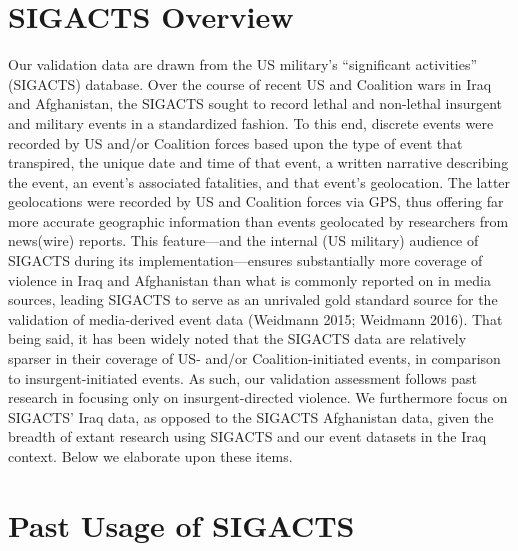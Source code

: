 \documentclass[12pt]{article}
\begin{document}

\section{SIGACTS Overview}

Our validation data are drawn from the US military's ``significant activities'' (SIGACTS) database. Over the course of recent US and Coalition wars in Iraq and Afghanistan, the SIGACTS sought to record lethal and non-lethal insurgent and military events in a standardized fashion. To this end, discrete events were recorded by US and/or Coalition forces based upon the type of event that transpired, the unique date and time of that event, a written narrative describing the event, an event's associated fatalities, and that event's geolocation. The latter geolocations were recorded by US and Coalition forces via GPS, thus offering far more accurate geographic information than events geolocated by researchers from news(wire) reports. This feature---and the internal (US military) audience of SIGACTS during its implementation---ensures substantially more coverage of violence in Iraq and Afghanistan than what is commonly reported on in media sources, leading SIGACTS to serve as an unrivaled gold standard source for the validation of media-derived event data (Weidmann 2015; Weidmann 2016). That being said, it has been widely noted that the SIGACTS data are relatively sparser in their coverage of US- and/or Coalition-initiated events, in comparison to insurgent-initiated events. As such, our validation assessment follows past research in focusing only on insurgent-directed violence. We furthermore focus on SIGACTS' Iraq data, as opposed to the SIGACTS Afghanistan data, given the breadth of extant research using SIGACTS and our event datasets in the Iraq context. Below we elaborate upon these items.

\section{Past Usage of SIGACTS}
\end{document}
